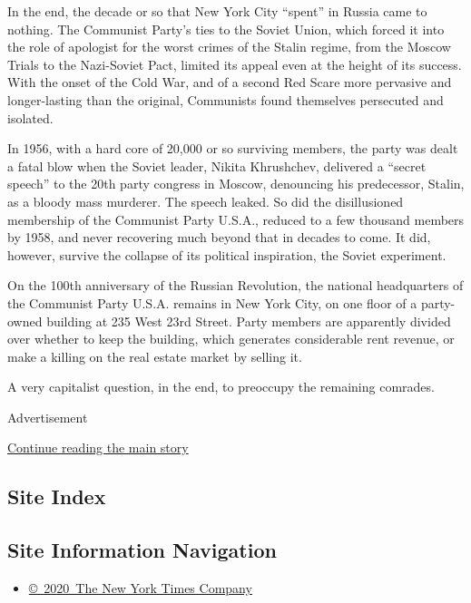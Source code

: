 In the end, the decade or so that New York City ``spent'' in Russia came
to nothing. The Communist Party's ties to the Soviet Union, which forced
it into the role of apologist for the worst crimes of the Stalin regime,
from the Moscow Trials to the Nazi-Soviet Pact, limited its appeal even
at the height of its success. With the onset of the Cold War, and of a
second Red Scare more pervasive and longer-lasting than the original,
Communists found themselves persecuted and isolated.

In 1956, with a hard core of 20,000 or so surviving members, the party
was dealt a fatal blow when the Soviet leader, Nikita Khrushchev,
delivered a ``secret speech'' to the 20th party congress in Moscow,
denouncing his predecessor, Stalin, as a bloody mass murderer. The
speech leaked. So did the disillusioned membership of the Communist
Party U.S.A., reduced to a few thousand members by 1958, and never
recovering much beyond that in decades to come. It did, however, survive
the collapse of its political inspiration, the Soviet experiment.

On the 100th anniversary of the Russian Revolution, the national
headquarters of the Communist Party U.S.A. remains in New York City, on
one floor of a party-owned building at 235 West 23rd Street. Party
members are apparently divided over whether to keep the building, which
generates considerable rent revenue, or make a killing on the real
estate market by selling it.

A very capitalist question, in the end, to preoccupy the remaining
comrades.

Advertisement

\protect\hyperlink{after-bottom}{Continue reading the main story}

\hypertarget{site-index}{%
\subsection{Site Index}\label{site-index}}

\hypertarget{site-information-navigation}{%
\subsection{Site Information
Navigation}\label{site-information-navigation}}

\begin{itemize}
\tightlist
\item
  \href{https://help.nytimes.com/hc/en-us/articles/115014792127-Copyright-notice}{©~2020~The
  New York Times Company}
\end{itemize}

